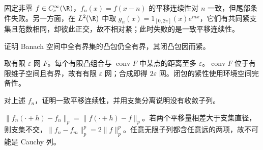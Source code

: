 \begin{example}[紧性的两种损失]
固定非零 $f\in C_c^\infty(\R)$，$f_n(x)=f(x-n)$ 的平移连续性对 $n$ 一致，但尾部条件失败。另一方面，在 $L^2(\R)$ 中取 $g_n(x)=1_{[0,2\pi]}(x)e^{inx}$，它们有共同紧支集且范数相同，却彼此正交，故不相对紧；此时失败的是一致平移连续性。
\end{example}

\begin{exercise}[紧闭包的凸化]\label{ex:y10-convex}
证明 Banach 空间中全有界集的凸包仍全有界，其闭凸包因而紧。
\end{exercise}
\begin{solution}
取有限 $\varepsilon$ 网 $F$。每个有限凸组合与 $\operatorname{conv}F$ 中某点的距离至多 $\varepsilon$。$\operatorname{conv}F$ 位于有限维子空间且有界，故有有限 $\varepsilon$ 网；合成即得 $2\varepsilon$ 网。闭包的紧性使用环境空间完备性。
\end{solution}

\begin{exercise}[去掉尾部条件]\label{ex:y10-tail}
对上述 $f_n$，证明一致平移连续性，并用支集分离说明没有收敛子列。
\end{exercise}
\begin{solution}
$\|f_n(\cdot+h)-f_n\|_p=\|f(\cdot+h)-f\|_p$。若两个平移量相差大于支集直径，则支集不交，$\|f_n-f_m\|_p^p=2\|f\|_p^p$。任意无限子列都含任意远的两项，故不可能是 Cauchy 列。
\end{solution}

